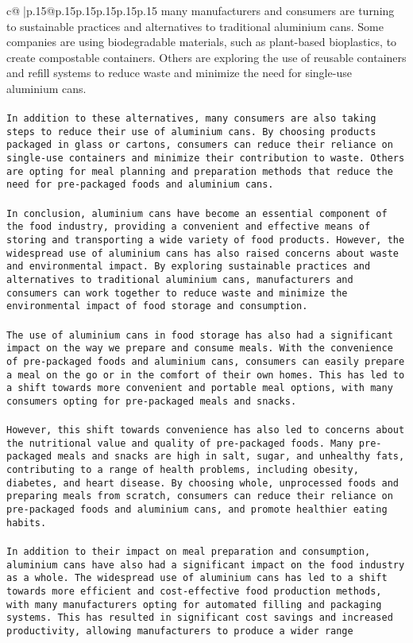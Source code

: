 \documentclass{article}
\begin{document}
{\begin{supertabular}{c@{$\;$}|p{.15\linewidth}@{}p{.15\linewidth}p{.15\linewidth}p{.15\linewidth}p{.15\linewidth}p{.15\linewidth}}
{{{many manufacturers and consumers are turning to sustainable practices and alternatives to traditional aluminium cans. Some companies are using biodegradable materials, such as plant-based bioplastics, to create compostable containers. Others are exploring the use of reusable containers and refill systems to reduce waste and minimize the need for single-use aluminium cans.\\ \tt \\ \tt In addition to these alternatives, many consumers are also taking steps to reduce their use of aluminium cans. By choosing products packaged in glass or cartons, consumers can reduce their reliance on single-use containers and minimize their contribution to waste. Others are opting for meal planning and preparation methods that reduce the need for pre-packaged foods and aluminium cans.\\ \tt \\ \tt In conclusion, aluminium cans have become an essential component of the food industry, providing a convenient and effective means of storing and transporting a wide variety of food products. However, the widespread use of aluminium cans has also raised concerns about waste and environmental impact. By exploring sustainable practices and alternatives to traditional aluminium cans, manufacturers and consumers can work together to reduce waste and minimize the environmental impact of food storage and consumption.\\ \tt \\ \tt The use of aluminium cans in food storage has also had a significant impact on the way we prepare and consume meals. With the convenience of pre-packaged foods and aluminium cans, consumers can easily prepare a meal on the go or in the comfort of their own homes. This has led to a shift towards more convenient and portable meal options, with many consumers opting for pre-packaged meals and snacks.\\ \tt \\ \tt However, this shift towards convenience has also led to concerns about the nutritional value and quality of pre-packaged foods. Many pre-packaged meals and snacks are high in salt, sugar, and unhealthy fats, contributing to a range of health problems, including obesity, diabetes, and heart disease. By choosing whole, unprocessed foods and preparing meals from scratch, consumers can reduce their reliance on pre-packaged foods and aluminium cans, and promote healthier eating habits.\\ \tt \\ \tt In addition to their impact on meal preparation and consumption, aluminium cans have also had a significant impact on the food industry as a whole. The widespread use of aluminium cans has led to a shift towards more efficient and cost-effective food production methods, with many manufacturers opting for automated filling and packaging systems. This has resulted in significant cost savings and increased productivity, allowing manufacturers to produce a wider range }}}
\end{supertabular}}
\end{document}
